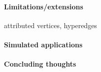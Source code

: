 % 
% 
% 
% 



\paragraph{Limitations/extensions}

attributed vertices, hyperedges

\paragraph{Simulated applications}

\paragraph{Concluding thoughts}






